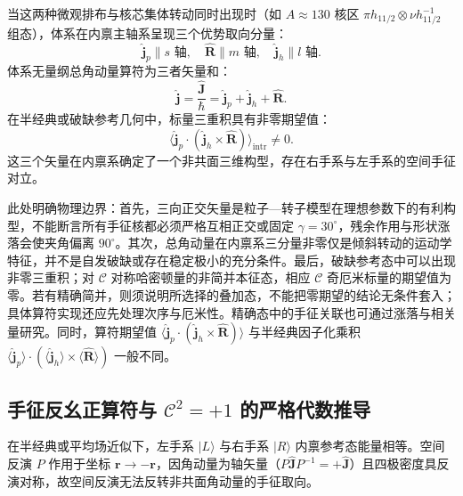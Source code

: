 当这两种微观排布与核芯集体转动同时出现时（如 $A \approx 130$ 核区 $\pi h_{11/2} \otimes \nu h_{11/2}^{-1}$ 组态），体系在内禀主轴系呈现三个优势取向分量：
\begin{equation}\label{eq:3-5-triad}
\hat{\mathbf{j}}_p \parallel s \text{ 轴}, \quad \hat{\mathbf{R}} \parallel m \text{ 轴}, \quad \hat{\mathbf{j}}_h \parallel l \text{ 轴}.
\end{equation}
体系无量纲总角动量算符为三者矢量和：
\begin{equation}\label{eq:3-5-j-sum}
\hat{\mathbf{j}} = \frac{\hat{\mathbf{J}}}{\hbar} = \hat{\mathbf{j}}_p + \hat{\mathbf{j}}_h + \hat{\mathbf{R}}.
\end{equation}
在半经典或破缺参考几何中，标量三重积具有非零期望值：
\begin{equation}\label{eq:3-5-triple-prod}
\langle \hat{\mathbf{j}}_p \cdot (\hat{\mathbf{j}}_h \times \hat{\mathbf{R}}) \rangle_{\text{intr}} \ne 0.
\end{equation}
这三个矢量在内禀系确定了一个非共面三维构型，存在右手系与左手系的空间手征对立\cite{liu-chen-2016-78br-chirality-reflection-symmetry-thesis}。

此处明确物理边界：首先，三向正交矢量是粒子—转子模型在理想参数下的有利构型，不能断言所有手征核都必须严格互相正交或固定 $\gamma = 30^\circ$，残余作用与形状涨落会使夹角偏离 $90^\circ$。其次，总角动量在内禀系三分量非零仅是倾斜转动的运动学特征，并不是自发破缺或存在稳定极小的充分条件。最后，破缺参考态中可以出现非零三重积；对 $\mathcal{C}$ 对称哈密顿量的非简并本征态，相应 $\mathcal{C}$ 奇厄米标量的期望值为零。若有精确简并，则须说明所选择的叠加态，不能把零期望的结论无条件套入；具体算符实现还应先处理次序与厄米性。精确态中的手征关联也可通过涨落与相关量研究。同时，算符期望值 $\langle \hat{\mathbf{j}}_p \cdot (\hat{\mathbf{j}}_h \times \hat{\mathbf{R}}) \rangle$ 与半经典因子化乘积 $\langle \hat{\mathbf{j}}_p \rangle \cdot (\langle \hat{\mathbf{j}}_h \rangle \times \langle \hat{\mathbf{R}} \rangle)$ 一般不同。

\subsection{手征反幺正算符与 $\mathcal{C}^2 = +1$ 的严格代数推导}\label{sec:3-5-2}

在半经典或平均场近似下，左手系 $|L\rangle$ 与右手系 $|R\rangle$ 内禀参考态能量相等。空间反演 $P$ 作用于坐标 $\mathbf{r} \to -\mathbf{r}$，因角动量为轴矢量（$P \hat{\mathbf{J}} P^{-1} = +\hat{\mathbf{J}}$）且四极密度具反演对称，故空间反演无法反转非共面角动量的手征取向。

